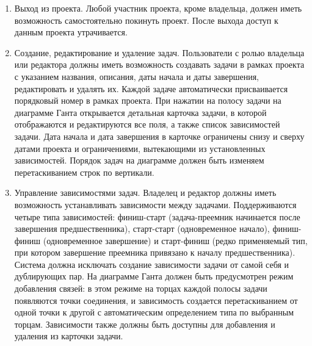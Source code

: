 \begin{enumerate}
    \item Выход из проекта. Любой участник проекта, кроме владельца, должен иметь возможность самостоятельно покинуть проект. После выхода доступ к данным проекта утрачивается.

    \item Создание, редактирование и удаление задач. Пользователи с ролью владельца или редактора должны иметь возможность создавать задачи в рамках проекта с указанием названия, описания, даты начала и даты завершения, редактировать и удалять их. Каждой задаче автоматически присваивается порядковый номер в рамках проекта. При нажатии на полосу задачи на диаграмме Ганта открывается детальная карточка задачи, в которой отображаются и редактируются все поля, а также список зависимостей задачи. Дата начала и дата завершения в карточке ограничены снизу и сверху датами проекта и ограничениями, вытекающими из установленных зависимостей. Порядок задач на диаграмме должен быть изменяем перетаскиванием строк по вертикали.

    \item Управление зависимостями задач. Владелец и редактор должны иметь возможность устанавливать зависимости между задачами. Поддерживаются четыре типа зависимостей: финиш-старт (задача-преемник начинается после завершения предшественника), старт-старт (одновременное начало), финиш-финиш (одновременное завершение) и старт-финиш (редко применяемый тип, при котором завершение преемника привязано к началу предшественника). Система должна исключать создание зависимости задачи от самой себя и дублирующих пар. На диаграмме Ганта должен быть предусмотрен режим добавления связей: в этом режиме на торцах каждой полосы задачи появляются точки соединения, и зависимость создается перетаскиванием от одной точки к другой с автоматическим определением типа по выбранным торцам. Зависимости также должны быть доступны для добавления и удаления из карточки задачи.


\end{enumerate}
